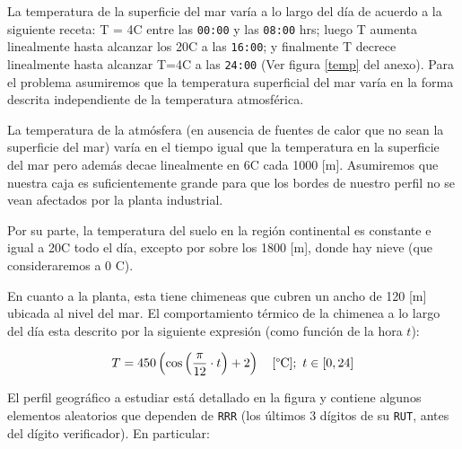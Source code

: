 \documentclass[letterpaper,11pt]{article} %
\begin{document}
\newpage
{}

La temperatura de la superficie del mar varía a lo largo del día de acuerdo a
la siguiente receta: T = 4\textordmasculine C entre las \texttt{00:00} y las
\texttt{08:00} hrs; luego T aumenta linealmente hasta alcanzar los
20\textordmasculine C a las \texttt{16:00}; y finalmente T decrece linealmente
hasta alcanzar T=4\textordmasculine C a las \texttt{24:00} (Ver figura \ref{temp} del anexo). Para el problema asumiremos que la temperatura superficial del mar varía en la forma descrita independiente de la temperatura atmosférica.

\newp La temperatura de la atmósfera (en ausencia de fuentes de calor que no sean la
superficie del mar) varía en el tiempo igual que la temperatura en la
superficie del mar pero además decae linealmente en 6\textordmasculine C cada
1000 [m]. Asumiremos que nuestra caja es suficientemente grande para que los
bordes de nuestro perfil no se vean afectados por la planta industrial.

\newp Por su parte, la temperatura del suelo en la región continental es constante e
igual a 20\textordmasculine C todo el día, excepto por sobre los 1800 [m],
donde hay nieve (que consideraremos a 0 \textordmasculine C).

\newp En cuanto a la planta, esta tiene chimeneas que cubren un ancho de 120 [m]
ubicada al nivel del mar. El comportamiento térmico de la chimenea a lo largo
del día esta descrito por la siguiente expresión (como función de la hora $t$):

$$
T = 450 \left(  \cos\left( \frac{\pi}{12}\cdot t \right) + 2 \right)
\quad [{\rm \degree C}];\ t \in [0,24]
$$


El perfil geográfico a estudiar está detallado en la figura y contiene algunos
elementos aleatorios que dependen de \texttt{RRR} (los últimos 3 dígitos de su
\texttt{RUT}, antes del dígito verificador). En particular:
\end{document}
